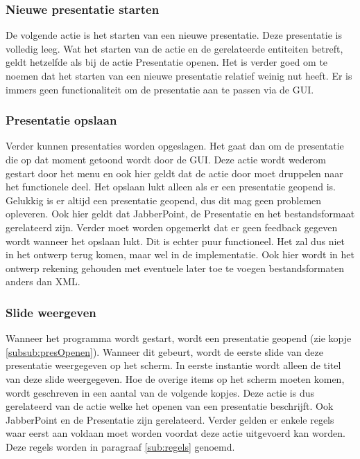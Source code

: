 \documentclass[a4paper]{article}
\begin{document}
\subsubsection{Nieuwe presentatie starten}
De volgende actie is het starten van een nieuwe presentatie. Deze presentatie is volledig leeg. Wat het starten van de actie en de gerelateerde entiteiten betreft, geldt hetzelfde als bij de actie Presentatie openen. Het is verder goed om te noemen dat het starten van een nieuwe presentatie relatief weinig nut heeft. Er is immers geen functionaliteit om de presentatie aan te passen via de GUI.

\subsubsection{Presentatie opslaan}
Verder kunnen presentaties worden opgeslagen. Het gaat dan om de presentatie die op dat moment getoond wordt door de GUI. Deze actie wordt wederom gestart door het menu en ook hier geldt dat de actie door moet druppelen naar het functionele deel. Het opslaan lukt alleen als er een presentatie geopend is. Gelukkig is er altijd een presentatie geopend, dus dit mag geen problemen opleveren. Ook hier geldt dat JabberPoint, de Presentatie en het bestandsformaat gerelateerd zijn. Verder moet worden opgemerkt dat er geen feedback gegeven wordt wanneer het opslaan lukt. Dit is echter puur functioneel. Het zal dus niet in het ontwerp terug komen, maar wel in de implementatie. Ook hier wordt in het ontwerp rekening gehouden met eventuele later toe te voegen bestandsformaten anders dan XML.

\subsubsection{Slide weergeven}
\label{subsub:volgendeSlide}
Wanneer het programma wordt gestart, wordt een presentatie geopend (zie kopje \ref{subsub:presOpenen}). Wanneer dit gebeurt, wordt de eerste slide van deze presentatie weergegeven op het scherm. In eerste instantie wordt alleen de titel van deze slide weergegeven. Hoe de overige items op het scherm moeten komen, wordt geschreven in een aantal van de volgende kopjes. Deze actie is dus gerelateerd van de actie welke het openen van een presentatie beschrijft. Ook JabberPoint en de Presentatie zijn gerelateerd. Verder gelden er enkele regels waar eerst aan voldaan moet worden voordat deze actie uitgevoerd kan worden. Deze regels worden in paragraaf \ref{sub:regels} genoemd.
\end{document}
